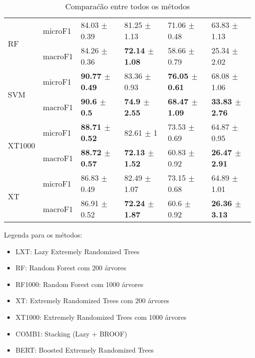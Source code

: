 \documentclass[]{article}
\begin{document}
\begin{table}[ht]
\begin{tabular}{llllll}
  \multirow{2}{*}{RF} & microF1 & 84.03 $\pm$  0.39 & 81.25 $\pm$  1.13 & 71.06 $\pm$  0.48 & 63.83 $\pm$  1.13 \\ 
   & macroF1 & 84.26 $\pm$  0.36 & \bf{72.14 $\pm$  1.08} & 58.66 $\pm$  0.79 & 25.34 $\pm$  2.02 \\ 
  \multirow{2}{*}{SVM} & microF1 & \bf{90.77 $\pm$  0.49} & 83.36 $\pm$  0.93 & \bf{76.05 $\pm$  0.61} & 68.08 $\pm$  1.06 \\ 
   & macroF1 & \bf{90.6 $\pm$  0.5} & \bf{74.9 $\pm$  2.55} & \bf{68.47 $\pm$  1.09} & \bf{33.83 $\pm$  2.76} \\ 
  \multirow{2}{*}{XT1000} & microF1 & \bf{88.71 $\pm$  0.52} & 82.61 $\pm$  1 & 73.53 $\pm$  0.69 & 64.87 $\pm$  0.95 \\ 
   & macroF1 & \bf{88.72 $\pm$  0.57} & \bf{72.13 $\pm$  1.52} & 60.83 $\pm$  0.92 & \bf{26.47 $\pm$  2.91} \\ 
  \multirow{2}{*}{XT} & microF1 & 86.83 $\pm$  0.49 & 82.49 $\pm$  1.07 & 73.15 $\pm$  0.68 & 64.89 $\pm$  1.01 \\ 
   & macroF1 & 86.91 $\pm$  0.52 & \bf{72.24 $\pm$  1.87} & 60.6 $\pm$  0.92 & \bf{26.36 $\pm$  3.13} \\ 
   \hline
\end{tabular}
\caption{Comparaćão entre todos os métodos} 
\end{table}

Legenda para os métodos:

\begin{itemize}
\itemsep1pt\parskip0pt
\item
  LXT: Lazy Extremely Randomized Trees
\item
  RF: Random Forest com 200 árvores
\item
  RF1000: Random Forest com 1000 árvores
\item
  XT: Extremely Randomized Trees com 200 árvores
\item
  XT1000: Extremely Randomized Trees com 1000 árvores
\item
  COMB1: Stacking (Lazy + BROOF)
\item
  BERT: Boosted Extremely Randomized Trees
\end{itemize}
\end{document}
